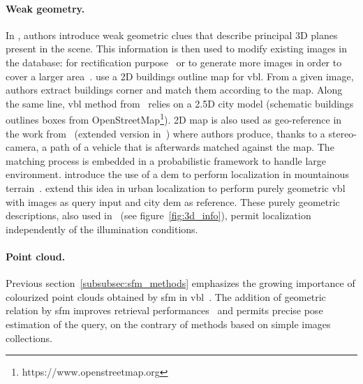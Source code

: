 		\paragraph{Weak geometry.}
			\label{subsubsec:weak_geometry}			
			In \citep{Torii2015,Chen2011}, authors introduce weak geometric clues that describe principal 3D planes present in the scene. This information is then used to modify existing images in the database: for rectification purpose~\citep{Chen2011} or to generate more images in order to cover a larger area~\citep{Torii2015}. \citet{Cham2010} use a 2D buildings outline map for \ac{vbl}. From a given image, authors extract buildings corner and match them according to the map. Along the same line, \ac{vbl} method from~\citep{Arth2015,Armagan2017a,Armagan2017b,Armagan2017} relies on a 2.5D city model (schematic buildings outlines boxes from OpenStreetMap\footnote{https://www.openstreetmap.org}). 2D map is also used as geo-reference in the work from~\citep{Brubaker2013} (extended version in~\citep{Brubaker2016}) where authors produce, thanks to a stereo-camera, a path of a vehicle that is afterwards matched against the map. The matching process is embedded in a probabilistic framework to handle large environment. \citet{Baatz2012} introduce the use of a \ac{dem} to perform localization in mountainous terrain~\citep{Ramalingam2010,Tzeng2013,Chen2015}. \citet{Bansal2014} extend this idea in urban localization to perform purely geometric \ac{vbl} with images as query input and city \ac{dem} as reference. These purely geometric descriptions, also used in~\citep{Matei2013,Christie2016,Ramalingam2010,Ramalingam2011} (see figure~\ref{fig:3d_info}), permit localization independently of the illumination conditions.

		\paragraph{Point cloud.}
        \label{subsubsec:3d_geometry}
			Previous section~\ref{subsubsec:sfm_methods} emphasizes the growing importance of colourized point clouds obtained by \ac{sfm} in \ac{vbl}~\citep{Irschara2009,Li2010,Sattler2011,Sattler2012,Sattler2015,Middelberg2014,Lynen2015,Lu2015,Svarm2014,Zeisl2015,Svarm2016,Sattler2016a,Feng2016a}. The addition of geometric relation by \ac{sfm} improves retrieval performances~\citep{Sattler2012a} and permits precise pose estimation of the query, on the contrary of methods based on simple images collections.
			

